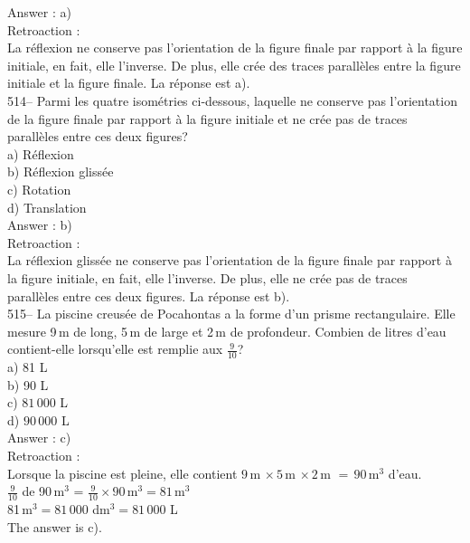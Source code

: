 ﻿\documentclass[letterpaper, 12pt]{article}
\begin{document}
Answer : a)\\

Retroaction :\\
La r\'eflexion ne conserve pas l'orientation de la figure finale par rapport
\`a la figure initiale, en fait, elle l'inverse. De plus, elle cr\'ee des
traces parall\`eles entre la figure initiale et la figure finale.  La
r\'eponse est a).\\

514--  Parmi les quatre isom\'etries ci-dessous, laquelle ne conserve pas
l'orientation de la figure finale par rapport \`a la figure initiale et ne
cr\'ee pas de traces parall\`eles entre ces deux figures?\\
a) R\'eflexion\\
b) R\'eflexion gliss\'ee\\
c) Rotation\\
d) Translation\\

Answer : b)\\

Retroaction :\\
La r\'eflexion gliss\'ee ne conserve pas l'orientation de la figure finale
par rapport \`a la figure initiale, en fait, elle l'inverse. De plus, elle
ne cr\'ee pas de traces parall\`eles entre ces deux figures.  La r\'eponse
est b).\\

515-- La piscine creus\'ee de Pocahontas a la forme d'un prisme
rectangulaire.  Elle mesure 9\,m de long, 5\,m de large et 2\,m de
profondeur.  Combien de litres d'eau contient-elle lorsqu'elle est remplie
aux $\frac{9}{10}$?\\
a) 81 L\\
b) 90 L\\
c) $81\,000$ L\\
d) $90\,000$ L\\

Answer : c)\\

Retroaction :\\
Lorsque la piscine est pleine, elle contient $9$\,m
$\times\,5$\,m $\times\,2$\,m $=\,90$\,m$^{3}$ d'eau.\\[2mm]
$\frac{9}{10}$ de 90\,m$^{3}$ =
$\frac{9}{10}\times90$\,m$^{3}=81$\,m$^{3}$\\[2mm]
81\,m$^{3}=81\,000$ dm$^{3}=81\,000$ L\\[2mm]
The answer is c).\\
\end{document}

